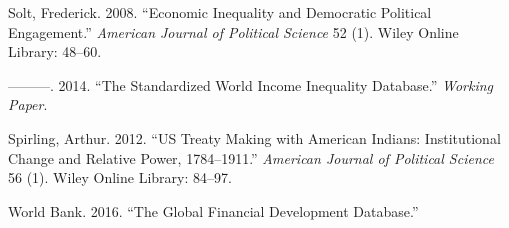 \documentclass[]{article}
\begin{document}
\hypertarget{ref-solt2008economic}{}
Solt, Frederick. 2008. ``Economic Inequality and Democratic Political
Engagement.'' \emph{American Journal of Political Science} 52 (1). Wiley
Online Library: 48--60.

\hypertarget{ref-Solt2014}{}
---------. 2014. ``The Standardized World Income Inequality Database.''
\emph{Working Paper}.

\hypertarget{ref-spirling2012us}{}
Spirling, Arthur. 2012. ``US Treaty Making with American Indians:
Institutional Change and Relative Power, 1784--1911.'' \emph{American
Journal of Political Science} 56 (1). Wiley Online Library: 84--97.

\hypertarget{ref-worldbank2016}{}
World Bank. 2016. ``The Global Financial Development Database.''
\end{document}

